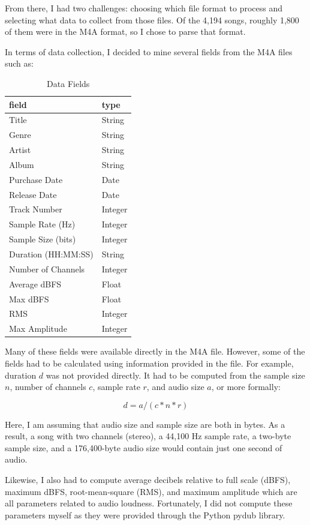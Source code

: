 \documentclass[journal]{vgtc}                %
\begin{document}
From there, I had two challenges: choosing which file format to process and
selecting what data to collect from those files. Of the 4,194 songs, roughly
1,800 of them were in the M4A format, so I chose to parse that format.

In terms of data collection, I decided to mine several fields from the M4A files
such as:

\begin{table}[h]
  \caption{Data Fields}
  \label{tab:fields}
  \scriptsize%
	\centering%
  \begin{tabu}{l l}
  \toprule
    field & type \\
  \midrule
  Title & String \\
  Genre & String \\
  Artist & String \\
  Album & String \\
  Purchase Date & Date \\
  Release Date & Date \\
  Track Number & Integer \\
  Sample Rate (Hz) & Integer \\
  Sample Size (bits) & Integer \\
  Duration (HH:MM:SS) & String \\
  Number of Channels & Integer \\
  Average dBFS & Float \\
  Max dBFS & Float \\
  RMS & Integer \\
  Max Amplitude & Integer \\
  \midrule
  \end{tabu}%
\end{table}

Many of these fields were available directly in the M4A file. However, some of
the fields had to be calculated using information provided in the file. For
example, duration $d$ was not provided directly. It had to be computed from the
sample size $n$, number of channels $c$, sample rate $r$, and audio size $a$, or
more formally:

\[ d = a / (c * n * r) \]

Here, I am assuming that audio size and sample size are both in bytes. As a
result, a song with two channels (stereo), a 44,100 Hz sample rate, a two-byte
sample size, and a 176,400-byte audio size would contain just one second of
audio.

Likewise, I also had to compute average decibels relative to full scale (dBFS),
maximum dBFS, root-mean-square (RMS), and maximum amplitude which are all
parameters related to audio loudness. Fortunately, I did not compute these
parameters myself as they were provided through the Python pydub library.
\end{document}
